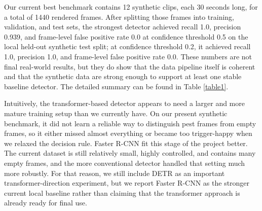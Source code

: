 \documentclass[11pt]{article}
\begin{document}
Our current best benchmark contains 12 synthetic clips, each 30 seconds long, for a total of 1440 rendered frames. After splitting those frames into training, validation, and test sets, the strongest detector achieved recall 1.0, precision 0.939, and frame-level false positive rate 0.0 at confidence threshold 0.5 on the local held-out synthetic test split; at confidence threshold 0.2, it achieved recall 1.0, precision 1.0, and frame-level false positive rate 0.0. These numbers are not final real-world results, but they do show that the data pipeline itself is coherent and that the synthetic data are strong enough to support at least one stable baseline detector. The detailed summary can be found in Table \ref{table1}.

\begin{table}[H]
    \centering
    \caption{Current key held-out synthetic test results. All values are local smoke-scale synthetic results, not external instructor-test results.}\label{table1}
\end{table}

Intuitively, the transformer-based detector appears to need a larger and more mature training setup than we currently have. On our present synthetic benchmark, it did not learn a reliable way to distinguish pest frames from empty frames, so it either missed almost everything or became too trigger-happy when we relaxed the decision rule. Faster R-CNN fit this stage of the project better. The current dataset is still relatively small, highly controlled, and contains many empty frames, and the more conventional detector handled that setting much more robustly. For that reason, we still include DETR as an important transformer-direction experiment, but we report Faster R-CNN as the stronger current local baseline rather than claiming that the transformer approach is already ready for final use.
\end{document}
